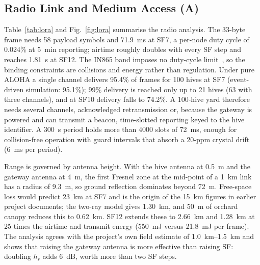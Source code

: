 \documentclass[conference]{IEEEtran}
\newcommand{\evA}{\textsf{A}}  %
\begin{document}
\subsection{Radio Link and Medium Access (\evA)}\label{sec:r-radio}
Table~\ref{tab:lora} and Fig.~\ref{fig:lora} summarise the radio analysis. The 33-byte frame needs 58 payload symbols and \SI{71.9}{ms} at SF7, a per-node duty cycle of 0.024\% at \SI{5}{min} reporting; airtime roughly doubles with every SF step and reaches \SI{1.81}{s} at SF12. The IN865 band imposes no duty-cycle limit~\cite{lorawanrp,actility2025}, so the binding constraints are collisions and energy rather than regulation. Under pure ALOHA a single channel delivers 95.4\% of frames for 100 hives at SF7 (event-driven simulation: 95.1\%); 99\% delivery is reached only up to 21 hives (63 with three channels), and at SF10 delivery falls to 74.2\%. A 100-hive yard therefore needs several channels, acknowledged retransmission or, because the gateway is powered and can transmit a beacon, time-slotted reporting keyed to the hive identifier. A \SI{300}{s} period holds more than 4000 slots of \SI{72}{ms}, enough for collision-free operation with guard intervals that absorb a 20-ppm crystal drift (\SI{6}{ms} per period).

Range is governed by antenna height. With the hive antenna at \SI{0.5}{m} and the gateway antenna at \SI{4}{m}, the first Fresnel zone at the mid-point of a \SI{1}{km} link has a radius of \SI{9.3}{m}, so ground reflection dominates beyond \SI{72}{m}. Free-space loss would predict \SI{23}{km} at SF7 and is the origin of the \SI{15}{km} figures in earlier project documents; the two-ray model gives \SI{1.30}{km}, and \SI{50}{m} of orchard canopy reduces this to \SI{0.62}{km}. SF12 extends these to \SI{2.66}{km} and \SI{1.28}{km} at 25 times the airtime and transmit energy (\SI{550}{mJ} versus \SI{21.8}{mJ} per frame). The analysis agrees with the project's own field estimate of \SIrange{1.0}{1.5}{km} and shows that raising the gateway antenna is more effective than raising SF: doubling $h_r$ adds \SI{6}{dB}, worth more than two SF steps.
\end{document}
